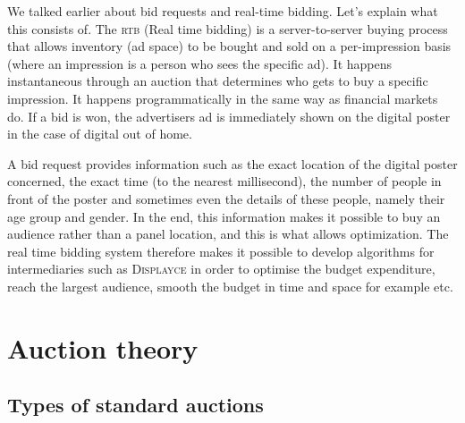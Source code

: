 \documentclass[12pt]{article}
\newcommand{\disp}{\textsc{Displayce}\xspace}
\begin{document}
We talked earlier about bid requests and real-time bidding. Let's explain what this consists of. The \textsc{rtb} (Real time bidding) is a server-to-server buying process that allows inventory (ad space) to be bought and sold on a per-impression basis (where an impression is a person who sees the specific ad). It happens instantaneous through an auction that determines who gets to buy a specific impression. It happens programmatically in the same way as financial markets do. If a bid is won, the advertisers ad is immediately shown on the digital poster in the case of digital out of home. 

A bid request provides information such as the exact location of the digital poster concerned, the exact time (to the nearest millisecond), the number of people in front of the poster and sometimes even the details of these people, namely their age group and gender. In the end, this information makes it possible to buy an audience rather than a panel location, and this is what allows optimization. The real time bidding system therefore makes it possible to develop algorithms for intermediaries such as \disp in order to optimise the budget expenditure, reach the largest audience, smooth the budget in time and space for example etc.

\newpage

\section{Auction theory}
\subsection{Types of standard auctions}
\end{document}
